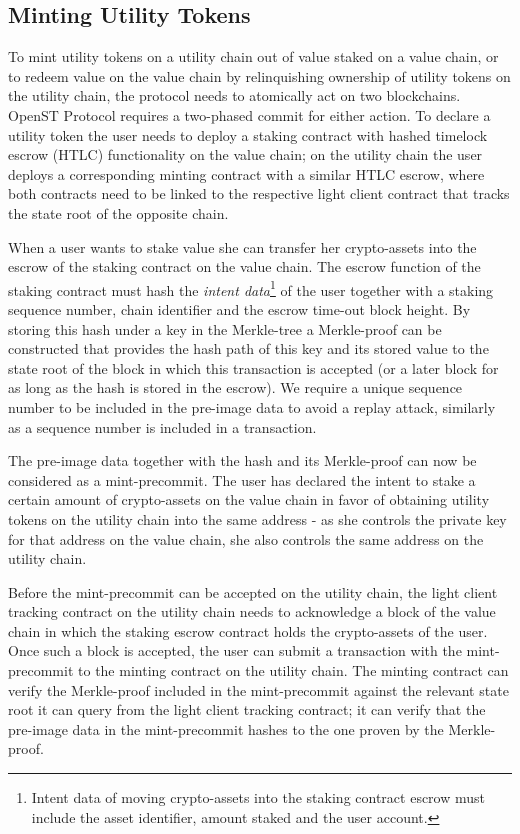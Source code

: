 \documentclass[12pt,a4paper, twocolumn]{article}
\begin{document}
\subsection{Minting Utility Tokens}
To mint utility tokens on a utility chain out of value staked on a value chain, or to redeem value on the value chain by relinquishing ownership of utility tokens on the utility chain, the protocol needs to atomically act on two blockchains.  OpenST Protocol requires a two-phased commit for either action.  To declare a utility token the user needs to deploy  a staking contract with hashed timelock escrow (HTLC) functionality on the value chain; on the utility chain the user deploys a corresponding minting contract with a similar HTLC escrow, where both contracts need to be linked to the respective light client contract that tracks the state root of the opposite chain. \par
When a user wants to stake value she can transfer her crypto-assets into the escrow of the staking contract on the value chain.  The escrow function of the staking contract must hash the \textit{intent data}\footnote{Intent data of moving crypto-assets into the staking contract escrow must include the asset identifier, amount staked and the user account.} of the user together with a staking sequence number, chain identifier and the escrow time-out block height. By storing this hash under a key in the Merkle-tree a Merkle-proof can be constructed that provides the hash path of this key and its stored value to the state root of the block in which this transaction is accepted (or a later block for as long as the hash is stored in the escrow).  We require a unique sequence number to be included in the pre-image data to avoid a replay attack, similarly as a sequence number is included in a transaction. \par
The pre-image data together with the hash and its Merkle-proof can now be considered as a mint-precommit.  The user has declared the intent to stake a certain amount of crypto-assets on the value chain in favor of obtaining utility tokens on the utility chain into the same address - as she controls the private key for that address on the value chain, she also controls the same address on the utility chain. \par
Before the mint-precommit can be accepted on the utility chain, the light client tracking contract on the utility chain needs to acknowledge a block of the value chain in which the staking escrow contract holds the crypto-assets of the user.  Once such a block is accepted, the user can submit a transaction with the mint-precommit to the minting contract on the utility chain.  The minting contract can verify the Merkle-proof included in the mint-precommit against the relevant state root it can query from the light client tracking contract; it can verify that the pre-image data in the mint-precommit hashes to the one proven by the Merkle-proof.\par
\end{document}

